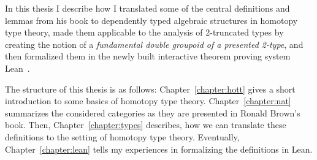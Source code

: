 In this thesis I describe how I translated some of the central definitions and
lemmas from his book to dependently typed algebraic structures in homotopy type
theory, made them applicable to the analysis of 2-truncated types by creating
the notion of a \emph{fundamental double groupoid of a presented 2-type},
and then formalized them in the newly built interactive theorem proving system
Lean~\cite{lean1}.

The structure of this thesis is as follows: Chapter~\ref{chapter:hott} gives
a short introduction to some basics of homotopy type theory. Chapter~\ref{chapter:nat}
summarizes the considered categories as they are presented in Ronald Brown's book.
Then, Chapter~\ref{chapter:types} describes, how we can translate these
definitions to the setting of homotopy type theory.
Eventually, Chapter~\ref{chapter:lean} tells my experiences in formalizing
the definitions in Lean.



